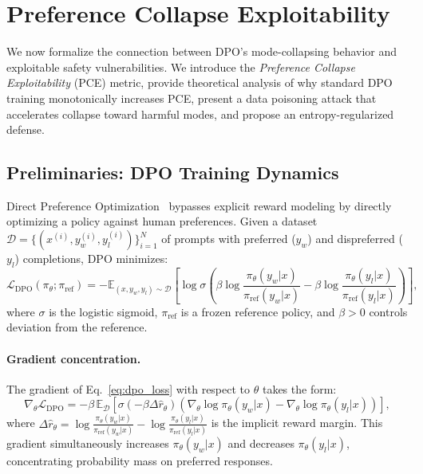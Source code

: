 \section{Preference Collapse Exploitability}
\label{sec:method}

We now formalize the connection between DPO's mode-collapsing behavior and exploitable safety vulnerabilities. We introduce the \emph{Preference Collapse Exploitability} (PCE) metric, provide theoretical analysis of why standard DPO training monotonically increases PCE, present a data poisoning attack that accelerates collapse toward harmful modes, and propose an entropy-regularized defense.

\subsection{Preliminaries: DPO Training Dynamics}
\label{sec:preliminaries}

Direct Preference Optimization~\citep{rafailov2023dpo} bypasses explicit reward modeling by directly optimizing a policy against human preferences. Given a dataset $\mathcal{D} = \{(x^{(i)}, y_w^{(i)}, y_l^{(i)})\}_{i=1}^N$ of prompts with preferred ($y_w$) and dispreferred ($y_l$) completions, DPO minimizes:
\begin{equation}
\label{eq:dpo_loss}
\mathcal{L}_{\text{DPO}}(\pi_\theta; \pi_{\text{ref}}) = -\mathbb{E}_{(x,y_w,y_l)\sim\mathcal{D}} \left[\log \sigma\!\left(\beta \log \frac{\pi_\theta(y_w|x)}{\pi_{\text{ref}}(y_w|x)} - \beta \log \frac{\pi_\theta(y_l|x)}{\pi_{\text{ref}}(y_l|x)}\right)\right],
\end{equation}
where $\sigma$ is the logistic sigmoid, $\pi_{\text{ref}}$ is a frozen reference policy, and $\beta > 0$ controls deviation from the reference.

\paragraph{Gradient concentration.} The gradient of Eq.~\eqref{eq:dpo_loss} with respect to $\theta$ takes the form:
\begin{equation}
\label{eq:dpo_gradient}
\nabla_\theta \mathcal{L}_{\text{DPO}} = -\beta\, \mathbb{E}_{\mathcal{D}}\!\left[\sigma(-\beta \Delta\hat{r}_\theta)\left(\nabla_\theta \log \pi_\theta(y_w|x) - \nabla_\theta \log \pi_\theta(y_l|x)\right)\right],
\end{equation}
where $\Delta\hat{r}_\theta = \log \frac{\pi_\theta(y_w|x)}{\pi_{\text{ref}}(y_w|x)} - \log \frac{\pi_\theta(y_l|x)}{\pi_{\text{ref}}(y_l|x)}$ is the implicit reward margin. This gradient simultaneously increases $\pi_\theta(y_w|x)$ and decreases $\pi_\theta(y_l|x)$, concentrating probability mass on preferred responses.

